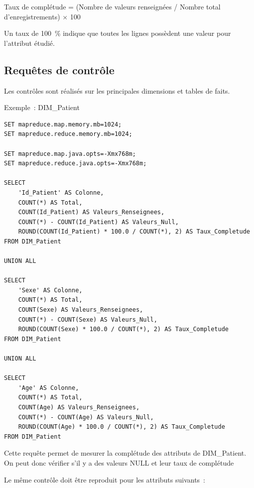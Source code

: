 \begin{center}
Taux de complétude = (Nombre de valeurs renseignées / Nombre total d'enregistrements) $\times$ 100
\end{center}

\noindent Un taux de 100~\% indique que toutes les lignes possèdent une valeur pour l'attribut étudié.

\subsection{Requêtes de contrôle}

\noindent Les contrôles sont réalisés sur les principales dimensions et tables de faits.

\noindent Exemple~: DIM\_Patient

\begin{verbatim}
SET mapreduce.map.memory.mb=1024;
SET mapreduce.reduce.memory.mb=1024;

SET mapreduce.map.java.opts=-Xmx768m;
SET mapreduce.reduce.java.opts=-Xmx768m;

SELECT
    'Id_Patient' AS Colonne,
    COUNT(*) AS Total,
    COUNT(Id_Patient) AS Valeurs_Renseignees,
    COUNT(*) - COUNT(Id_Patient) AS Valeurs_Null,
    ROUND(COUNT(Id_Patient) * 100.0 / COUNT(*), 2) AS Taux_Completude
FROM DIM_Patient

UNION ALL

SELECT
    'Sexe' AS Colonne,
    COUNT(*) AS Total,
    COUNT(Sexe) AS Valeurs_Renseignees,
    COUNT(*) - COUNT(Sexe) AS Valeurs_Null,
    ROUND(COUNT(Sexe) * 100.0 / COUNT(*), 2) AS Taux_Completude
FROM DIM_Patient

UNION ALL

SELECT
    'Age' AS Colonne,
    COUNT(*) AS Total,
    COUNT(Age) AS Valeurs_Renseignees,
    COUNT(*) - COUNT(Age) AS Valeurs_Null,
    ROUND(COUNT(Age) * 100.0 / COUNT(*), 2) AS Taux_Completude
FROM DIM_Patient
\end{verbatim}

\noindent Cette requête permet de mesurer la complétude des attributs de DIM\_Patient. On peut donc vérifier s'il y a des valeurs NULL et leur taux de complétude

\noindent Le même contrôle doit être reproduit pour les attributs suivants~:

